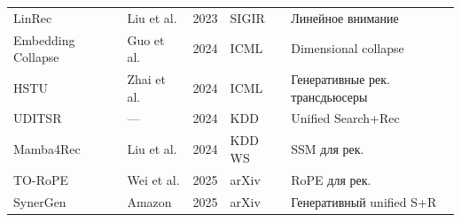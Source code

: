 \begin{longtable}{p{3.5cm} p{3cm} p{1cm} p{2cm} p{4cm}}
    LinRec & Liu et al. & 2023 & SIGIR & Линейное внимание \\
    Embedding Collapse & Guo et al. & 2024 & ICML & Dimensional collapse \\
    HSTU & Zhai et al. & 2024 & ICML & Генеративные рек. трансдьюсеры \\
    UDITSR & --- & 2024 & KDD & Unified Search+Rec \\
    Mamba4Rec & Liu et al. & 2024 & KDD WS & SSM для рек. \\
    TO-RoPE & Wei et al. & 2025 & arXiv & RoPE для рек. \\
    SynerGen & Amazon & 2025 & arXiv & Генеративный unified S+R \\
\end{longtable}
